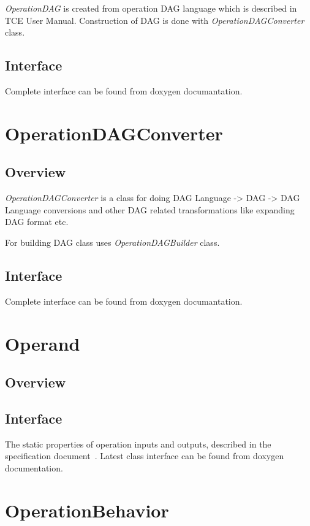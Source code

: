 \documentclass[a4paper,twoside]{tce}
\begin{document}
\emph{OperationDAG} is created from operation DAG language which is described
in TCE User Manual. Construction of DAG is done with \emph{OperationDAGConverter}
class.

\subsection{Interface}

Complete interface can be found from doxygen documantation.

\section{OperationDAGConverter}
\label{sec:operationdagconverter}

\subsection{Overview}

\emph{OperationDAGConverter} is a class for doing DAG Language -> DAG -> DAG Language
conversions and other DAG related transformations like expanding DAG format etc.

For building DAG class uses \emph{OperationDAGBuilder} class.

\subsection{Interface}

Complete interface can be found from doxygen documantation.

\section{Operand}
\label{sec:operand}

\subsection{Overview}

\subsection{Interface}

The static properties of operation inputs and outputs, described in the
specification document~\cite{OSAL-specs}. Latest class interface can be found
from doxygen documentation.

\section{OperationBehavior}
\label{sec:opBehavior}
\end{document}
